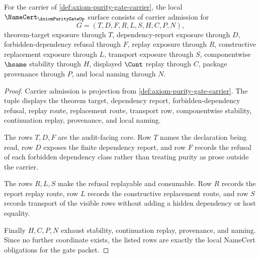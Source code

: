 \begin{theorem}
\label{thm:axiom-purity-gate-namecert-obligations}
For the carrier of \autoref{def:axiom-purity-gate-carrier}, the local $\NameCert_{\AxiomPurityGateUp}$ surface consists of carrier admission for
$$
G=(T,D,F,R,L,S,H,C,P,N),
$$
theorem-target exposure through $T$, dependency-report exposure through $D$, forbidden-dependency refusal through $F$, replay exposure through $R$, constructive replacement exposure through $L$, transport exposure through $S$, componentwise $\hsame$ stability through $H$, displayed $\Cont$ replay through $C$, package provenance through $P$, and local naming through $N$.
\end{theorem}
\begin{proof}
Carrier admission is projection from \autoref{def:axiom-purity-gate-carrier}. The tuple displays the theorem target, dependency report, forbidden-dependency refusal, replay route, replacement route, transport row, componentwise stability, continuation replay, provenance, and local naming.

The rows $T,D,F$ are the audit-facing core. Row $T$ names the declaration being read, row $D$ exposes the finite dependency report, and row $F$ records the refusal of each forbidden dependency class rather than treating purity as prose outside the carrier.

The rows $R,L,S$ make the refusal replayable and consumable. Row $R$ records the report replay route, row $L$ records the constructive replacement route, and row $S$ records transport of the visible rows without adding a hidden dependency or host equality.

Finally $H,C,P,N$ exhaust stability, continuation replay, provenance, and naming. Since no further coordinate exists, the listed rows are exactly the local NameCert obligations for the gate packet.
\end{proof}

